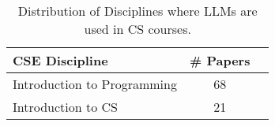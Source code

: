 \begin{table}[ht]
    \centering
    \caption{Distribution of Disciplines where LLMs are used in CS courses.}
    \begin{tabular}{l c p{4cm}}
        \toprule
        \textbf{CSE Discipline} & \textbf{\# Papers} \\
        \midrule
		Introduction to Programming & 68 \\
		Introduction to CS & 21 \\

\end{tabular}
\end{table}
